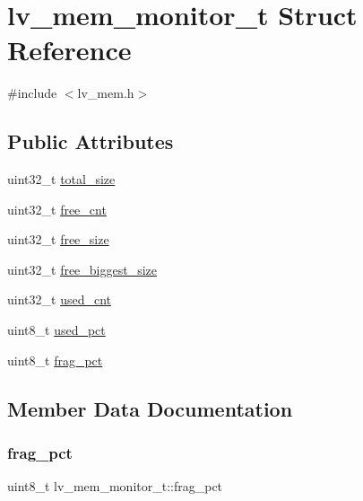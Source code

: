 \hypertarget{structlv__mem__monitor__t}{}\section{lv\+\_\+mem\+\_\+monitor\+\_\+t Struct Reference}
\label{structlv__mem__monitor__t}


{\ttfamily \#include $<$lv\+\_\+mem.\+h$>$}

\subsection*{Public Attributes}
\begin{DoxyCompactItemize}
\item 
uint32\+\_\+t \mbox{\hyperlink{structlv__mem__monitor__t_ae61235bccfb5119ca2fe58db1148f48b}{total\+\_\+size}}
\item 
uint32\+\_\+t \mbox{\hyperlink{structlv__mem__monitor__t_a46dc7a9d497afe396db3f3da455c15a1}{free\+\_\+cnt}}
\item 
uint32\+\_\+t \mbox{\hyperlink{structlv__mem__monitor__t_a27adcfe2602ed3d9f91cab48e3b789fd}{free\+\_\+size}}
\item 
uint32\+\_\+t \mbox{\hyperlink{structlv__mem__monitor__t_a2e415ca957da17290eb8055dc0c89982}{free\+\_\+biggest\+\_\+size}}
\item 
uint32\+\_\+t \mbox{\hyperlink{structlv__mem__monitor__t_aa2404ca716ab5481106528be7925bff6}{used\+\_\+cnt}}
\item 
uint8\+\_\+t \mbox{\hyperlink{structlv__mem__monitor__t_a729716db06d7a5ecb2fea65bdc29e6aa}{used\+\_\+pct}}
\item 
uint8\+\_\+t \mbox{\hyperlink{structlv__mem__monitor__t_a68d42298e5029f634e5a19f27fa7da2e}{frag\+\_\+pct}}
\end{DoxyCompactItemize}


\subsection{Member Data Documentation}
\mbox{\label{structlv__mem__monitor__t_a68d42298e5029f634e5a19f27fa7da2e}} 
\subsubsection{\texorpdfstring{frag\_pct}{frag\_pct}}
{\footnotesize\ttfamily uint8\+\_\+t lv\+\_\+mem\+\_\+monitor\+\_\+t\+::frag\+\_\+pct}

